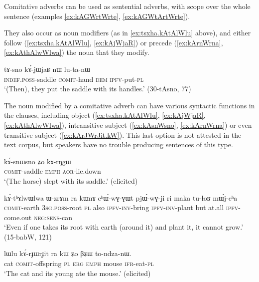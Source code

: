 Comitative adverbs can be used as sentential adverbs, with scope over the whole sentence (examples \ref{ex:kAGWrtWrte}, \ref{ex:kAGWtArtWrte}). 


They also occur as noun modifiers (as in \ref{ex:tsxha.kAtAlWlu} above), and either follow (\ref{ex:tsxha.kAtAlWlu}, \ref{ex:kAjWjaR}) or precede (\ref{ex:kArnWrna}, \ref{ex:kAthAlwWlwa}) the noun that they modify.


\begin{exe}
\ex \label{ex:kAjWjaR}
\gll tɤ-sno kɤ́-jɯ\redp{}jaʁ nɯ lu-ta-nɯ \\
\textsc{indef}.\textsc{poss}-saddle \textsc{comit}-hand \textsc{dem} \textsc{ipfv}-put-\textsc{pl} \\
\glt `(Then), they put the saddle with its handles.' (30-tAsno, 77)
\end{exe}
 

The noun modified by a comitative adverb can have various syntactic functions in the clauses, including object (\ref{ex:tsxha.kAtAlWlu}, \ref{ex:kAjWjaR}, \ref{ex:kAthAlwWlwa}), intransitive subject (\ref{ex:kAsnWsno}, \ref{ex:kArnWrna}) or even transitive subject (\ref{ex:kArJWrJit.kW}). This last option is not attested in the text corpus, but speakers have no trouble producing sentences of this type.


\begin{exe}
	\ex \label{ex:kAsnWsno}
	\gll kɤ́-snɯ\tld{}sno ʑo kɤ-rŋgɯ \\
	\textsc{comit}-saddle \textsc{emph} \textsc{aor}-lie.down \\
	\glt `(The horse) slept with its saddle.' (elicited)
\end{exe}


\begin{exe}
\ex \label{ex:kAthAlwWlwa}
\gll kɤ́-tʰɤlwɯ\tld{}lwa ɯ-zrɤm ra kɯnɤ cʰɯ́-wɣ-ɣɯt pjɯ́-wɣ-ji ri maka tu-ɬoʁ mɯ́j-cʰa \\ 
\textsc{comit}-earth \textsc{3sg}.\textsc{poss}-root \textsc{pl} also \textsc{ipfv}-\textsc{inv}-bring \textsc{ipfv}-\textsc{inv}-plant but at.all \textsc{ipfv}-come.out \textsc{neg}:\textsc{sens}-can \\
\glt `Even if one takes its root with earth (around it) and plant it, it cannot grow.' (15-babW, 121)
\end{exe}


\begin{exe}
\ex \label{ex:kArJWrJit.kW}
\gll lɯlu kɤ́-rɟɯ\tld{}rɟit ra kɯ ʑo βʑɯ to-ndza-nɯ. \\
cat \textsc{comit}-offspring \textsc{pl}  \textsc{erg} \textsc{emph} mouse \textsc{ifr}-eat-\textsc{pl} \\
\glt `The cat and its young ate the mouse.' (elicited)
\end{exe}

